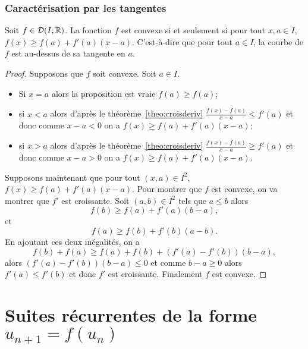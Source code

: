 \subsubsection{Caractérisation par les tangentes}

\begin{theo}
  Soit \(f \in \mathcal{D}(I,\mathbb{R})\). La fonction \(f\) est convexe si et seulement si 
  pour tout \(x,a \in I\), \(f(x) \geqslant f(a)+f'(a)(x-a)\). C'est-à-dire que 
  pour tout \(a \in I\), la courbe de \(f\) est au-dessus de sa tangente en 
  \(a\).
\end{theo}
\begin{proof}
  Supposons que \(f\) soit convexe. Soit \(a \in I\).
  \begin{itemize}
    \item Si \(x=a\) alors la proposition est vraie \(f(a) \geqslant f(a)\);
    \item si \(x < a\) alors d'après le théorème~\ref{theo:croisderiv}
      \(\frac{f(x)-f(a)}{x-a} \leqslant f'(a)\) et donc 
      comme \(x-a <0\) on a \(f(x) \geqslant f(a)+f'(a)(x-a)\);
    \item si \(x > a\) alors d'après le théorème~\ref{theo:croisderiv}
      \(\frac{f(x)-f(a)}{x-a} \geqslant f'(a)\) et donc 
      comme \(x-a >0\) on a \(f(x) \geqslant f(a)+f'(a)(x-a)\).
  \end{itemize}

  Supposons maintenant que  pour tout \((x,a) \in I^2\), \(f(x) \geqslant 
  f(a)+f'(a)(x-a)\). Pour montrer que \(f\) est convexe, on va montrer que 
  \(f'\) est croissante. Soit \((a,b) \in I^2\) tels que \(a \leqslant b\) alors
  \begin{equation}
    f(b) \geqslant f(a)+f'(a)(b-a),
  \end{equation}
  et
  \begin{equation}
    f(a) \geqslant f(b)+f'(b)(a-b).
  \end{equation}
  En ajoutant ces deux inégalités, on a
  \begin{equation}
    f(b)+f(a) \geqslant f(a)+f(b) +(f'(a)-f'(b))(b-a),
  \end{equation}
  alors \((f'(a)-f'(b))(b-a) \leqslant 0\) et comme \(b-a \geqslant 0\) alors 
  \(f'(a) \leqslant f'(b)\) et donc \(f'\) est croissante. Finalement \(f\) est 
  convexe.
\end{proof}

\section{Suites récurrentes de la forme \(u_{n+1}=f(u_n)\)}

